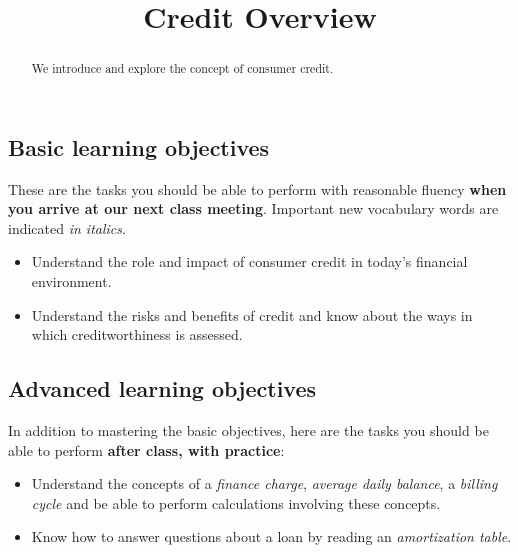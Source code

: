 \documentclass{ximera}
\title{Credit Overview}
\begin{document}
\begin{abstract}
We introduce and explore the concept of consumer credit.
\end{abstract}
\maketitle

\subsection*{Basic learning objectives}

These are the tasks you should be able to perform with reasonable fluency \textbf{when you arrive at our next class meeting}. Important new vocabulary words are indicated \emph{in italics}. 

\begin{itemize}
	\item Understand the role and impact of consumer credit in today's financial environment.
    \item Understand the risks and benefits of credit and know about the ways in which creditworthiness is assessed.
\end{itemize}

\subsection*{Advanced learning objectives}

In addition to mastering the basic objectives, here are the tasks you should be able to perform \textbf{after class, with practice}: 

\begin{itemize}
	\item Understand the concepts of a \emph{finance charge}, \emph{average daily balance}, a \emph{billing cycle} and be able to perform calculations involving these concepts.
    \item Know how to answer questions about a loan by reading an \emph{amortization table}.
\end{itemize}
\end{document}
